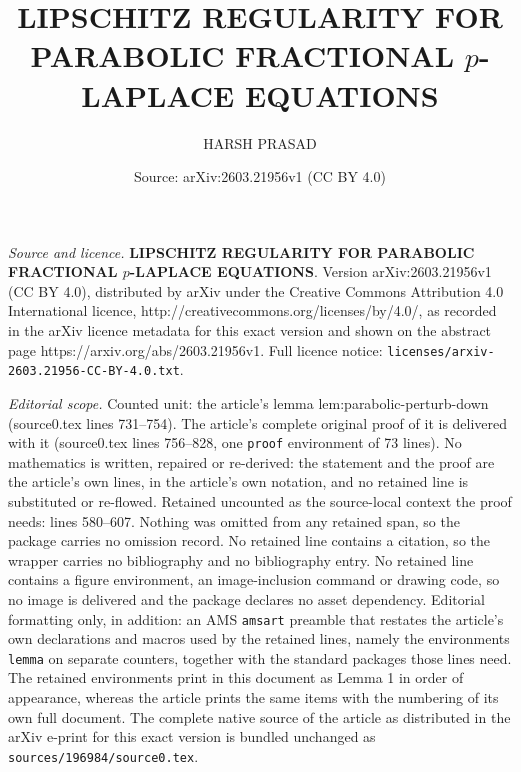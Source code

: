 \documentclass[10pt,a4paper]{amsart}
\title{\textbf{\Large LIPSCHITZ REGULARITY FOR PARABOLIC FRACTIONAL $p$-LAPLACE EQUATIONS}}
\author{HARSH PRASAD}
\date{Source: arXiv:2603.21956v1 (CC BY 4.0)}
\begin{document}
\maketitle

\noindent\emph{Source and licence.} \textbf{\Large LIPSCHITZ REGULARITY FOR PARABOLIC FRACTIONAL $p$-LAPLACE EQUATIONS}. Version arXiv:2603.21956v1 (CC BY 4.0), distributed by arXiv under the Creative Commons Attribution 4.0 International licence, http://creativecommons.org/licenses/by/4.0/, as recorded in the arXiv licence metadata for this exact version and shown on the abstract page https://arxiv.org/abs/2603.21956v1. Full licence notice: \texttt{licenses/arxiv-2603.21956-CC-BY-4.0.txt}.\par\smallskip

\noindent\textit{Editorial scope.} Counted unit: the article's lemma lem:parabolic-perturb-down (source0.tex lines 731--754). The article's complete original proof of it is delivered with it (source0.tex lines 756--828, one \texttt{proof} environment of 73 lines). No mathematics is written, repaired or re-derived: the statement and the proof are the article's own lines, in the article's own notation, and no retained line is substituted or re-flowed.  Retained uncounted as the source-local context the proof needs: lines 580--607.  Nothing was omitted from any retained span, so the package carries no omission record.  No retained line contains a citation, so the wrapper carries no bibliography and no bibliography entry.  No retained line contains a figure environment, an image-inclusion command or drawing code, so no image is delivered and the package declares no asset dependency.  Editorial formatting only, in addition: an AMS \texttt{amsart} preamble that restates the article's own declarations and macros used by the retained lines, namely the environments \texttt{lemma} on separate counters, together with the standard packages those lines need.  The retained environments print in this document as Lemma 1 in order of appearance, whereas the article prints the same items with the numbering of its own full document.  The complete native source of the article as distributed in the arXiv e-print for this exact version is bundled unchanged as \texttt{sources/196984/source0.tex}.
\end{document}
